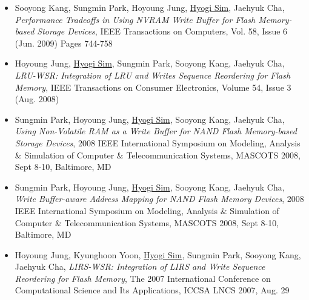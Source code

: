 \begin{itemize}
  {\it Identifying the FTL Mapping Scheme for USB Flash Devices},
  The 4th International Conference on Convergence Technology
  and Information Convergence, CTIC 2009, Oct. 12
\item Sooyong Kang, Sungmin Park, Hoyoung Jung, \underline{Hyogi Sim}, Jaehyuk Cha,
  {\it Performance Tradeoffs in Using NVRAM Write Buffer for Flash Memory-based
  Storage Devices},
  IEEE Transactions on Computers, Vol. 58, Issue 6 (Jun. 2009) Pages 744-758
\item Hoyoung Jung, \underline{Hyogi Sim}, Sungmin Park, Sooyong Kang, Jaehyuk Cha,
 {\it LRU-WSR: Integration of LRU and Writes Sequence Reordering for Flash
 Memory},
 IEEE Transactions on Consumer Electronics, Volume 54, Issue 3 (Aug. 2008)
\item Sungmin Park, Hoyoung Jung, \underline{Hyogi Sim}, Sooyong Kang, Jaehyuk Cha,
 {\it Using Non-Volatile RAM as a Write Buffer for NAND Flash Memory-based
 Storage Devices},
 2008 IEEE International Symposium on Modeling, Analysis \& Simulation of
 Computer \& Telecommunication Systems, MASCOTS 2008, Sept 8-10, Baltimore, MD
\item Sungmin Park, Hoyoung Jung, \underline{Hyogi Sim}, Sooyong Kang, Jaehyuk Cha,
 {\it Write Buffer-aware Address Mapping for NAND Flash Memory Devices},
 2008 IEEE International Symposium on Modeling, Analysis \& Simulation of
 Computer \& Telecommunication Systems, MASCOTS 2008, Sept 8-10, Baltimore, MD
\item Hoyoung Jung, Kyunghoon Yoon, \underline{Hyogi Sim},
 Sungmin Park, Sooyong Kang, Jaehyuk Cha,
 {\it LIRS-WSR: Integration of LIRS and Write Sequence Reordering for Flash
 Memory},
 The 2007 International Conference on Computational Science and Its
 Applications, ICCSA LNCS 2007, Aug. 29
\end{itemize}

